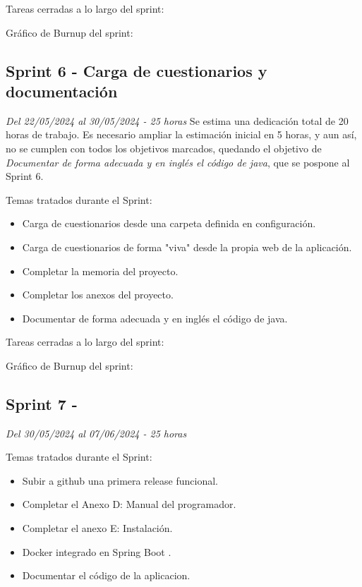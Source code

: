 Tareas cerradas a lo largo del sprint:

Gráfico de Burnup del sprint:

\subsection{Sprint 6 - Carga de cuestionarios y documentación}
\textit{Del 22/05/2024 al 30/05/2024 - 25 horas}
Se estima una dedicación total de 20 horas de trabajo.
Es necesario ampliar la estimación inicial en 5 horas, y aun así, no se cumplen con todos los objetivos marcados, quedando el objetivo de \textit{Documentar de forma adecuada y en inglés el código de java}, que se pospone al Sprint 6.

Temas tratados durante el Sprint:
\begin{itemize}
	\item
	Carga de cuestionarios desde una carpeta definida en configuración.
	\item
	Carga de cuestionarios de forma "viva" desde la propia web de la aplicación.
	\item
	Completar la memoria del proyecto.
	\item
	Completar los anexos del proyecto.
	\item
	Documentar de forma adecuada y en inglés el código de java.
\end{itemize}

Tareas cerradas a lo largo del sprint:

Gráfico de Burnup del sprint:


\subsection{Sprint 7 - }
\textit{Del 30/05/2024 al 07/06/2024 - 25 horas}

Temas tratados durante el Sprint:
\begin{itemize}
	\item Subir a github una primera release funcional.
	\item Completar el Anexo D: Manual del programador.
	\item Completar el anexo E: Instalación.
	\item Docker integrado en Spring Boot \cite{web:SpringDocker}.
	\item Documentar el código de la aplicacion.
\end{itemize}

